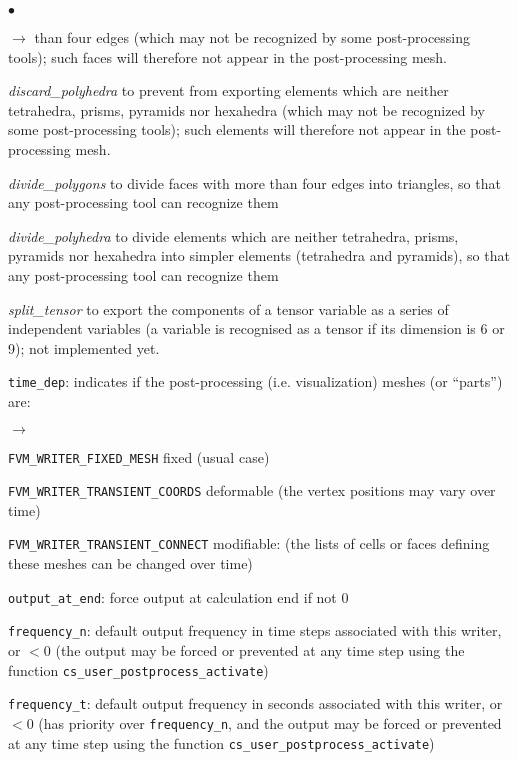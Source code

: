 {{{\begin{list}{$\bullet$}{}
\begin{list}{$\rightarrow$}{}
 than four edges (which may not be recognized by some post-processing tools); such
 faces will therefore not appear in the post-processing mesh.
               \item {\em discard\_polyhedra} to prevent from exporting elements which
 are neither tetrahedra, prisms, pyramids nor hexahedra (which may not be recognized by
 some post-processing tools); such elements will therefore not appear in
 the post-processing mesh.
               \item {\em divide\_polygons}  to divide faces with more than four edges
 into triangles, so that any post-processing tool can recognize them
               \item {\em divide\_polyhedra} to divide elements which are neither
 tetrahedra, prisms, pyramids nor hexahedra into simpler elements (tetrahedra and
 pyramids), so that any post-processing tool can recognize them
               \item {\em split\_tensor} to export the components of a tensor
 variable as a series of independent variables (a variable is recognised as a
 tensor if its dimension is 6 or 9); not implemented yet.
         \end{list}
       \item \texttt{time\_dep}: indicates if the post-processing
             (i.e. visualization) meshes (or ``parts'') are:
        \begin{list}{$\rightarrow$}{}
               \item \texttt{FVM\_WRITER\_FIXED\_MESH} fixed (usual case)
               \item \texttt{FVM\_WRITER\_TRANSIENT\_COORDS} deformable
                     (the vertex positions may vary over time)
               \item \texttt{FVM\_WRITER\_TRANSIENT\_CONNECT} modifiable:
                     (the lists of cells or faces
                     defining these meshes can be changed over time)
         \end{list}
       \item \texttt{output\_at\_end}: force output at calculation end
             if not 0
       \item \texttt{frequency\_n}: default output frequency in time steps
             associated with this writer, or $< 0$ (the output may be forced
             or prevented at any time step using the function
             \texttt{cs\_user\_postprocess\_activate})
       \item \texttt{frequency\_t}: default output frequency in seconds
             associated with this writer, or $< 0$ (has priority over
             \texttt{frequency\_n}, and the output may be forced or prevented
             at any time step using the function
             \texttt{cs\_user\_postprocess\_activate})
\end{list}

}}}
